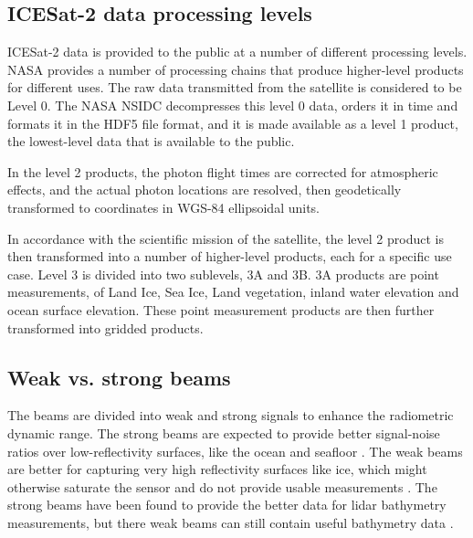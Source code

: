 
\subsection{ICESat-2 data processing levels}

ICESat-2 data is provided to the public at a number of different processing levels. NASA provides a number of processing chains that produce higher-level products for different uses. The raw data transmitted from the satellite is considered to be Level 0. The NASA NSIDC decompresses this level 0 data, orders it in time and formats it in the HDF5 file format, and it is made available as a level 1 product, the lowest-level data that is available to the public. 

In the level 2 products, the photon flight times are corrected for atmospheric effects, and the actual photon locations are resolved, then geodetically transformed to coordinates in WGS-84 ellipsoidal units. 

In accordance with the scientific mission of the satellite, the level 2 product is then transformed into a number of higher-level products, each for a specific use case. Level 3 is divided into two sublevels, 3A and 3B. 3A products are point measurements, of Land Ice, Sea Ice, Land vegetation, inland water elevation and ocean surface elevation. These point measurement products are then further transformed into gridded products.


\subsection{Weak vs. strong beams}

The beams are divided into weak and strong signals to enhance the radiometric dynamic range. The strong beams are expected to provide better signal-noise ratios over low-reflectivity surfaces, like the ocean and seafloor \parencite{Neumann2019d}. The weak beams are better for capturing very high reflectivity surfaces like ice, which might otherwise saturate the sensor and do not provide usable measurements \parencite{}. The strong beams have been found to provide the better data for lidar bathymetry measurements, but there weak beams can still contain useful bathymetry data \parencite{}.


